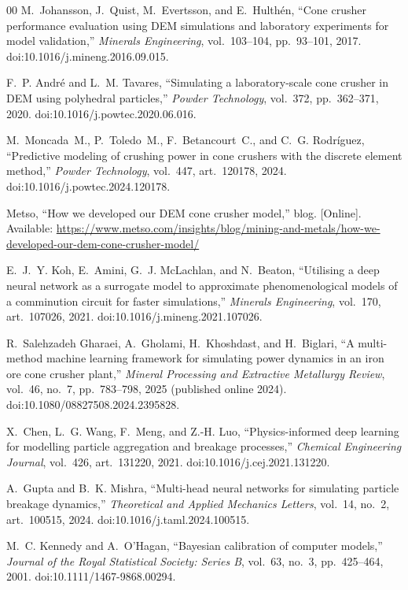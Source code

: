 \documentclass[journal]{IEEEtran}
\begin{document}
\begin{thebibliography}{00}
 M.~Johansson, J.~Quist, M.~Evertsson, and E.~Hulth\'en, ``Cone crusher performance evaluation using DEM
simulations and laboratory experiments for model validation,'' \emph{Minerals Engineering}, vol.~103--104, pp.~93--101,
2017. doi:10.1016/j.mineng.2016.09.015.

 F.~P. Andr\'e and L.~M. Tavares, ``Simulating a laboratory-scale cone crusher in DEM using polyhedral
particles,'' \emph{Powder Technology}, vol.~372, pp.~362--371, 2020. doi:10.1016/j.powtec.2020.06.016.

 M.~Moncada~M., P.~Toledo~M., F.~Betancourt~C., and C.~G. Rodr\'iguez, ``Predictive modeling of crushing
power in cone crushers with the discrete element method,'' \emph{Powder Technology}, vol.~447, art.~120178, 2024.
doi:10.1016/j.powtec.2024.120178.

 Metso, ``How we developed our DEM cone crusher model,'' blog. [Online]. Available:
\url{https://www.metso.com/insights/blog/mining-and-metals/how-we-developed-our-dem-cone-crusher-model/}

 E.~J.~Y. Koh, E.~Amini, G.~J. McLachlan, and N.~Beaton, ``Utilising a deep neural network as a surrogate
model to approximate phenomenological models of a comminution circuit for faster simulations,'' \emph{Minerals
Engineering}, vol.~170, art.~107026, 2021. doi:10.1016/j.mineng.2021.107026.

 R.~Salehzadeh Gharaei, A.~Gholami, H.~Khoshdast, and H.~Biglari, ``A multi-method machine learning framework for
simulating power dynamics in an iron ore cone crusher plant,'' \emph{Mineral Processing and Extractive Metallurgy Review},
vol.~46, no.~7, pp.~783--798, 2025 (published online 2024). doi:10.1080/08827508.2024.2395828.

 X.~Chen, L.~G. Wang, F.~Meng, and Z.-H. Luo, ``Physics-informed deep learning for modelling particle
aggregation and breakage processes,'' \emph{Chemical Engineering Journal}, vol.~426, art.~131220, 2021.
doi:10.1016/j.cej.2021.131220.

 A.~Gupta and B.~K. Mishra, ``Multi-head neural networks for simulating particle breakage dynamics,''
\emph{Theoretical and Applied Mechanics Letters}, vol.~14, no.~2, art.~100515, 2024. doi:10.1016/j.taml.2024.100515.

 M.~C. Kennedy and A.~O'Hagan, ``Bayesian calibration of computer models,'' \emph{Journal of the Royal
Statistical Society: Series B}, vol.~63, no.~3, pp.~425--464, 2001. doi:10.1111/1467-9868.00294.


\end{thebibliography}
\end{document}
